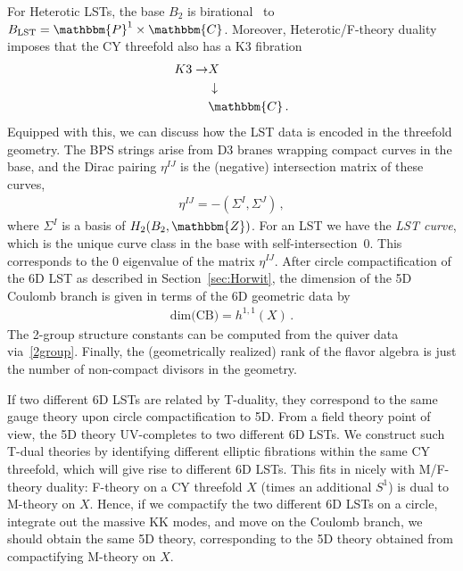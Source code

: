 \documentclass[11pt]{article}
\numberwithin{equation}{section}
\newcommand{\LST}{\text{LST}\xspace}
\begin{document}
For Heterotic LSTs, the base $B_2$ is birational~\cite{Bhardwaj:2015oru} to $B_{\LST} =\mathbbm{P}^{1} \times \mathbbm{C}$. Moreover, Heterotic/F-theory duality imposes that the CY threefold also has a K3 fibration
\begin{align}
\label{eq:K3fib}
\begin{split}
    K3 \rightarrow &X\\
    &\downarrow\\
    &\mathbbm{C}\,.
\end{split}
\end{align}
%
Equipped with this, we can discuss how the LST data is encoded in the threefold geometry. The BPS strings arise from D3 branes wrapping compact curves in the base, and the Dirac pairing $\eta^{IJ}$ is the (negative) intersection matrix of these curves,
\begin{align}
\eta^{IJ}=-(\Sigma^{I},\Sigma^{J})\,,
\end{align}
where $\Sigma^{I}$ is a basis of $H_{2}(B_{2},\mathbbm{Z})$. For an LST we have the \textit{LST curve}, which is the unique curve class in the base with self-intersection~0. This corresponds to the 0 eigenvalue of the matrix $\eta^{IJ}$. After circle compactification of the 6D LST as described in Section~\ref{sec:Horwit}, the dimension of the 5D Coulomb branch is given in terms of the 6D geometric data by
\begin{align}
\label{eq:CBdim}
\text{dim(CB)}=h^{1,1}(X) \, .
\end{align}
The 2-group structure constants can be computed from the quiver data via~\eqref{2group}. Finally, the (geometrically realized) rank of the flavor algebra is just the number of non-compact divisors in the geometry.

If two different 6D LSTs are related by T-duality, they correspond to the same gauge theory upon circle compactification to 5D. From a field theory point of view, the 5D theory UV-completes to two different 6D LSTs. We construct such T-dual theories by identifying different elliptic fibrations within the same CY threefold, which will give rise to different 6D LSTs. This fits in nicely with M/F-theory duality: F-theory on a CY threefold $X$ (times an additional $S^1$) is dual to M-theory on $X$. Hence, if we compactify the two different 6D LSTs on a circle, integrate out the massive KK modes, and move on the Coulomb branch, we should obtain the same 5D theory, corresponding to the 5D theory obtained from compactifying M-theory on $X$. 
\end{document}
